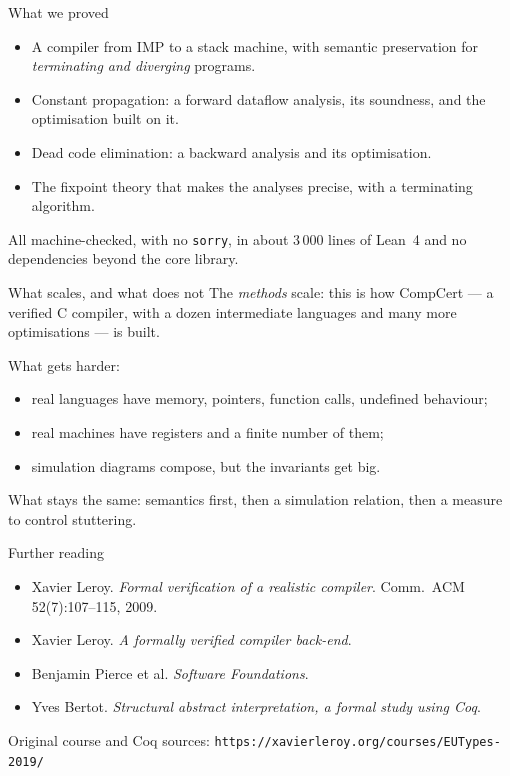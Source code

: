 \documentclass[aspectratio=169,10pt]{beamer}
\newcommand{\code}[1]{\texttt{\small #1}}
\begin{document}
\begin{frame}{What we proved}
\begin{itemize}\setlength{\itemsep}{4pt}
\item A compiler from IMP to a stack machine, with semantic preservation for
      \emph{terminating and diverging} programs.
\item Constant propagation: a forward dataflow analysis, its soundness, and
      the optimisation built on it.
\item Dead code elimination: a backward analysis and its optimisation.
\item The fixpoint theory that makes the analyses precise, with a
      terminating algorithm.
\end{itemize}
\medskip

All machine-checked, with no \code{sorry}, in about 3\,000 lines of Lean~4
and no dependencies beyond the core library.
\end{frame}

\begin{frame}{What scales, and what does not}
The \emph{methods} scale: this is how CompCert --- a verified C compiler,
with a dozen intermediate languages and many more optimisations --- is
built.
\medskip

What gets harder:
\begin{itemize}
\item real languages have memory, pointers, function calls, undefined
      behaviour;
\item real machines have registers and a finite number of them;
\item simulation diagrams compose, but the invariants get big.
\end{itemize}
\medskip

What stays the same: semantics first, then a simulation relation, then a
measure to control stuttering.
\end{frame}

\begin{frame}{Further reading}
\begin{itemize}\setlength{\itemsep}{4pt}
\item Xavier Leroy. \emph{Formal verification of a realistic compiler}.
      Comm.\ ACM 52(7):107--115, 2009.
\item Xavier Leroy. \emph{A formally verified compiler back-end}.
\item Benjamin Pierce et al. \emph{Software Foundations}.
\item Yves Bertot. \emph{Structural abstract interpretation, a formal study
      using Coq}.
\end{itemize}
\vfill
{\small Original course and Coq sources:
\texttt{https://xavierleroy.org/courses/EUTypes-2019/}}
\end{frame}
\end{document}
